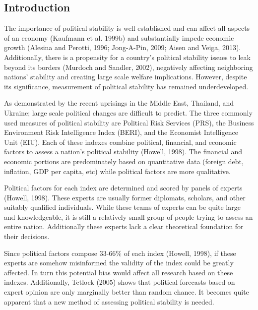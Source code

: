 \documentclass[12pt]{article}
\begin{document}
\begin{spacing}{1.5}

\section*{Introduction}

The importance of political stability is well established and can affect all aspects of an economy (Kaufmann et al. 1999b) and substantially impede economic growth (Alesina and Perotti, 1996; Jong-A-Pin, 2009; Aisen and Veiga, 2013). Additionally, there is a propensity for a country's political stability issues to leak beyond its borders (Murdoch and Sandler, 2002), negatively affecting neighboring nations' stability and creating large scale welfare implications. However, despite its significance, measurement of political stability has remained underdeveloped. 

As demonstrated by the recent uprisings in the Middle East, Thailand, and Ukraine; large scale political changes are difficult to predict. The three commonly used measures of political stability are Political Risk Services (PRS), the Business Environment Risk Intelligence Index (BERI), and the Economist Intelligence Unit (EIU). Each of these indexes combine political, financial, and economic factors to assess a nation's political stability (Howell, 1998). The financial and economic portions are predominately based on quantitative data (foreign debt, inflation, GDP per capita, etc) while political factors are more qualitative. 

Political factors for each index are determined and scored by panels of experts (Howell, 1998). These experts are usually former diplomats, scholars, and other suitably qualified individuals. While these teams of experts can be quite large and knowledgeable, it is still a relatively small group of people trying to assess an entire nation. Additionally these experts lack a clear theoretical foundation for their decisions. 

Since political factors compose 33-66\% of each index (Howell, 1998), if these experts are somehow misinformed the validity of the index could be greatly affected. In turn this potential bias would affect all research based on these indexes. Additionally, Tetlock (2005) shows that political forecasts based on expert opinion are only marginally better than random chance. It becomes quite apparent that a new method of assessing political stability is needed.  


\end{spacing}
\end{document}
